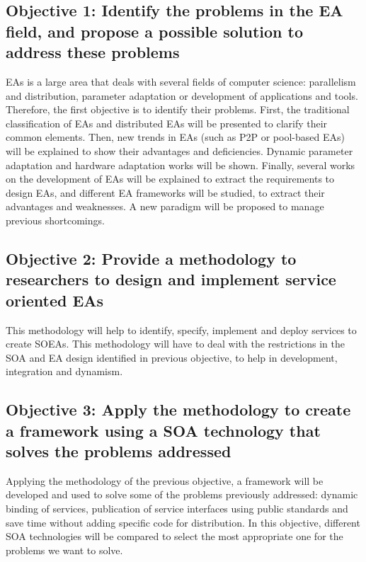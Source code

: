 \subsection*{Objective 1: Identify the problems in the EA field, and
  propose a possible solution to address these problems} %
\label{subsec:intro:obj:problems}
EAs is a large area that deals with several fields of computer science: parallelism and distribution, parameter adaptation or development of applications and tools. Therefore, the first objective is to identify their problems. First, the traditional classification of EAs and distributed EAs will be presented to clarify their common elements. Then, new trends in EAs (such as P2P or pool-based EAs) will be explained to show their advantages and deficiencies. Dynamic parameter adaptation and hardware adaptation works will be shown. Finally, several works on the development of EAs will be explained to extract the requirements to design EAs, and different EA frameworks will be studied, to extract their advantages and weaknesses. A new paradigm will be proposed to manage previous shortcomings.

\subsection*{Objective 2: Provide a methodology to researchers to design and implement service oriented EAs} 
\label{subsec:intro:obj:methodology}
This methodology will help to identify, specify, implement and deploy services to create SOEAs. This methodology will have to deal with the restrictions in the SOA and EA design identified in previous objective, to help in development, integration and dynamism.

\subsection*{Objective 3: Apply the methodology to create a framework using a SOA technology that solves the problems addressed}
\label{subsec:intro:obj:fwork}
Applying the methodology of the previous objective, a framework will be developed and used to solve some of the problems previously addressed: dynamic binding of services, publication of service interfaces using public standards and save time without adding specific code for distribution. In this objective, different SOA technologies will be compared to select the most appropriate one for the problems we want to solve.

